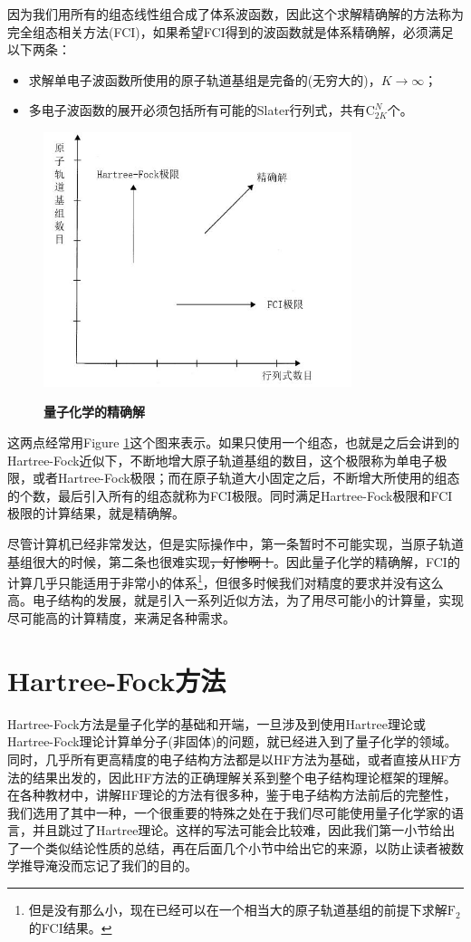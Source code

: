 \documentclass[12pt,a4paper,openany,twoside]{book}
\numberwithin{equation}{section}
\begin{document}
          因为我们用所有的组态线性组合成了体系波函数，因此这个求解精确解的方法称为完全组态相关方法(FCI)，如果希望FCI得到的波函数就是体系精确解，必须满足以下两条：
          \begin{itemize}
            \item 求解单电子波函数所使用的原子轨道基组是完备的(无穷大的)，$K \rightarrow \infty$；
            \item 多电子波函数的展开必须包括所有可能的Slater行列式，共有$\mathrm{C}_{2K}^N$个。
          \end{itemize}
          \begin{figure}
            \centering
            \includegraphics[width = 9cm]{fig/exactsolution.jpg}\\
            \caption{\textbf{量子化学的精确解}}
            \label{exact solution}
          \end{figure}
          
          这两点经常用Figure \ref{exact solution}这个图来表示。如果只使用一个组态，也就是之后会讲到的Hartree-Fock近似下，不断地增大原子轨道基组的数目，这个极限称为单电子极限，或者Hartree-Fock极限；而在原子轨道大小固定之后，不断增大所使用的组态的个数，最后引入所有的组态就称为FCI极限。同时满足Hartree-Fock极限和FCI极限的计算结果，就是精确解。
          
          尽管计算机已经非常发达，但是实际操作中，第一条暂时不可能实现，当原子轨道基组很大的时候，第二条也很难实现\sout{，好惨啊！}。因此量子化学的精确解，FCI的计算几乎只能适用于非常小的体系\footnote{但是没有那么小，现在已经可以在一个相当大的原子轨道基组的前提下求解$\text{F}_2$的FCI结果。}，但很多时候我们对精度的要求并没有这么高。电子结构的发展，就是引入一系列近似方法，为了用尽可能小的计算量，实现尽可能高的计算精度，来满足各种需求。
      \section{Hartree-Fock方法}
        Hartree-Fock方法是量子化学的基础和开端，一旦涉及到使用Hartree理论或Hartree-Fock理论计算单分子(非固体)的问题，就已经进入到了量子化学的领域。同时，几乎所有更高精度的电子结构方法都是以HF方法为基础，或者直接从HF方法的结果出发的，因此HF方法的正确理解关系到整个电子结构理论框架的理解。在各种教材中，讲解HF理论的方法有很多种，鉴于电子结构方法前后的完整性，我们选用了其中一种，一个很重要的特殊之处在于我们尽可能使用量子化学家的语言，并且跳过了Hartree理论。这样的写法可能会比较难，因此我们第一小节给出了一个类似结论性质的总结，再在后面几个小节中给出它的来源，以防止读者被数学推导淹没而忘记了我们的目的。
        
\end{document}
